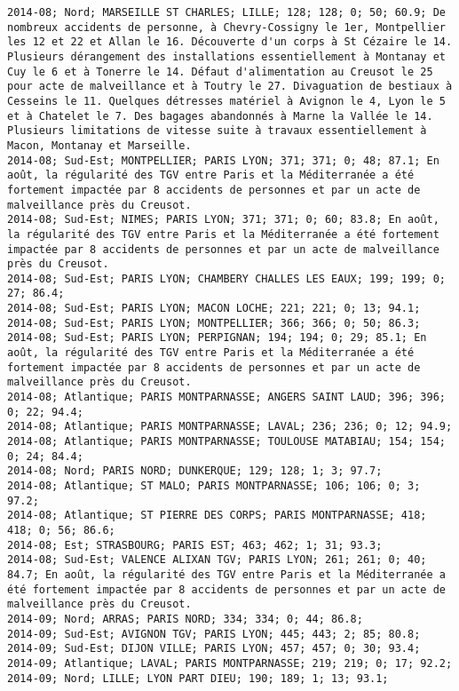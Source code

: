 \documentclass{article}
\begin{document}
\begin{Verbatim}[commandchars=\\\{\}]
2014-08; Nord; MARSEILLE ST CHARLES; LILLE; 128; 128; 0; 50; 60.9; De nombreux accidents de personne, à Chevry-Cossigny le 1er, Montpellier les 12 et 22 et Allan le 16. Découverte d'un corps à St Cézaire le 14.
Plusieurs dérangement des installations essentiellement à Montanay et Cuy le 6 et à Tonerre le 14. Défaut d'alimentation au Creusot le 25 pour acte de malveillance et à Toutry le 27. Divaguation de bestiaux à Cesseins le 11. Quelques détresses matériel à Avignon le 4, Lyon le 5 et à Chatelet le 7. Des bagages abandonnés à Marne la Vallée le 14. Plusieurs limitations de vitesse suite à travaux essentiellement à Macon, Montanay et Marseille.
2014-08; Sud-Est; MONTPELLIER; PARIS LYON; 371; 371; 0; 48; 87.1; En août, la régularité des TGV entre Paris et la Méditerranée a été fortement impactée par 8 accidents de personnes et par un acte de malveillance près du Creusot.
2014-08; Sud-Est; NIMES; PARIS LYON; 371; 371; 0; 60; 83.8; En août, la régularité des TGV entre Paris et la Méditerranée a été fortement impactée par 8 accidents de personnes et par un acte de malveillance près du Creusot.
2014-08; Sud-Est; PARIS LYON; CHAMBERY CHALLES LES EAUX; 199; 199; 0; 27; 86.4; 
2014-08; Sud-Est; PARIS LYON; MACON LOCHE; 221; 221; 0; 13; 94.1; 
2014-08; Sud-Est; PARIS LYON; MONTPELLIER; 366; 366; 0; 50; 86.3; 
2014-08; Sud-Est; PARIS LYON; PERPIGNAN; 194; 194; 0; 29; 85.1; En août, la régularité des TGV entre Paris et la Méditerranée a été fortement impactée par 8 accidents de personnes et par un acte de malveillance près du Creusot.
2014-08; Atlantique; PARIS MONTPARNASSE; ANGERS SAINT LAUD; 396; 396; 0; 22; 94.4; 
2014-08; Atlantique; PARIS MONTPARNASSE; LAVAL; 236; 236; 0; 12; 94.9; 
2014-08; Atlantique; PARIS MONTPARNASSE; TOULOUSE MATABIAU; 154; 154; 0; 24; 84.4; 
2014-08; Nord; PARIS NORD; DUNKERQUE; 129; 128; 1; 3; 97.7; 
2014-08; Atlantique; ST MALO; PARIS MONTPARNASSE; 106; 106; 0; 3; 97.2; 
2014-08; Atlantique; ST PIERRE DES CORPS; PARIS MONTPARNASSE; 418; 418; 0; 56; 86.6; 
2014-08; Est; STRASBOURG; PARIS EST; 463; 462; 1; 31; 93.3; 
2014-08; Sud-Est; VALENCE ALIXAN TGV; PARIS LYON; 261; 261; 0; 40; 84.7; En août, la régularité des TGV entre Paris et la Méditerranée a été fortement impactée par 8 accidents de personnes et par un acte de malveillance près du Creusot.
2014-09; Nord; ARRAS; PARIS NORD; 334; 334; 0; 44; 86.8; 
2014-09; Sud-Est; AVIGNON TGV; PARIS LYON; 445; 443; 2; 85; 80.8; 
2014-09; Sud-Est; DIJON VILLE; PARIS LYON; 457; 457; 0; 30; 93.4; 
2014-09; Atlantique; LAVAL; PARIS MONTPARNASSE; 219; 219; 0; 17; 92.2; 
2014-09; Nord; LILLE; LYON PART DIEU; 190; 189; 1; 13; 93.1; 

\end{Verbatim}
\end{document}
